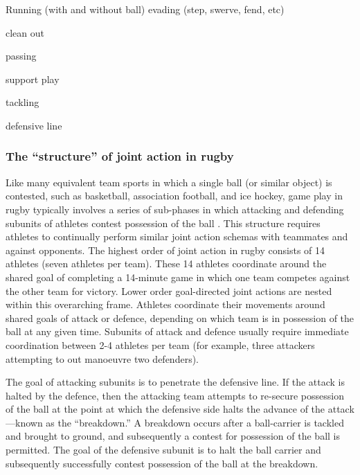 \begin{CJK}{UTF8}{gbsn}
Running (with and without ball)
evading (step, swerve, fend, etc)

clean out

passing

support play






tackling

defensive line





\subsubsection{The ``structure'' of joint action in rugby}
Like many equivalent team sports in which a single ball (or similar object) is contested, such as basketball, association football, and ice hockey, game play in rugby typically involves a series of sub-phases in which attacking and defending subunits of athletes contest possession of the ball \citep{Passos2011}. This structure requires athletes to continually perform similar joint action schemas with teammates and against opponents.   The highest order of joint action in rugby consists of 14 athletes (seven athletes per team).  These 14 athletes coordinate around the shared goal of completing a 14-minute game in which one team competes against the other team for victory.  Lower order goal-directed joint actions are nested within this overarching frame. Athletes coordinate their movements around shared goals of attack or defence, depending on which team is in possession of the ball at any given time.  Subunits of attack and defence usually require immediate coordination between 2-4 athletes per team (for example, three attackers attempting to out manoeuvre two defenders).

The goal of attacking subunits is to penetrate the defensive line. If the attack is halted by the defence, then the attacking team attempts to re-secure possession of the ball at the point at which the defensive side halts the advance of the attack---known as the ``breakdown.''  A breakdown occurs after a ball-carrier is tackled and brought to ground, and subsequently a contest for possession of the ball is permitted.  The goal of the defensive subunit is to halt the ball carrier and subsequently successfully contest possession of the ball at the breakdown.


\end{CJK}
